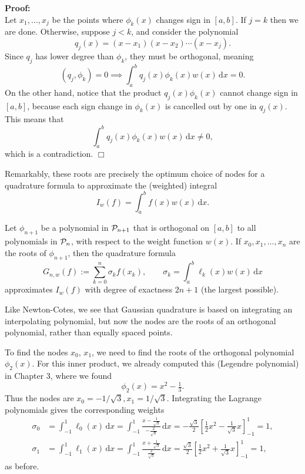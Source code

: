 \documentclass[
  letterpaper,
  DIV=11,
  numbers=noendperiod]{scrreprt}
\newenvironment{fbxSimple}[3]{\begin{tcolorbox}[enhanced, breakable,%
attach boxed title to top*={xshift=1.4pt},
boxed title style={boxrule=0.0mm, fuzzy shadow={1pt}{-1pt}{0mm}{0.1mm}{gray}, arc=.3em, rounded corners=east, sharp corners=west}, colframe=#1-color2, colbacktitle=#1-color1, colback = white, coltitle=black,  titlerule=0mm, toprule=0pt, bottomrule=.7pt, leftrule=.3em, rightrule=.7pt, outer arc=.3em,  	left=.5em, right=.5em, bottomtitle=1mm, toptitle=1mm,title=\textbf{#2}\hspace{0.5em}{#3}]}
{\end{tcolorbox}}
\begin{document}
\textbf{Proof:}\\
Let \(x_1,\ldots,x_j\) be the points where \(\phi_k(x)\) changes sign in
\([a,b]\). If \(j=k\) then we are done. Otherwise, suppose \(j<k\), and
consider the polynomial \[
q_j(x) = (x-x_1)(x-x_2)\cdots(x-x_j).
\] Since \(q_j\) has lower degree than \(\phi_k\), they must be
orthogonal, meaning \[
(q_j,\phi_k)=0 \implies \int_a^b q_j(x)\phi_k(x)w(x)\,\mathrm{d}x = 0.
\] On the other hand, notice that the product \(q_j(x)\phi_k(x)\) cannot
change sign in \([a,b]\), because each sign change in \(\phi_k(x)\) is
cancelled out by one in \(q_j(x)\). This means that \[
\int_a^b q_j(x)\phi_k(x)w(x)\,\mathrm{d}x \neq 0,
\] which is a contradiction. \(\Box\)

Remarkably, these roots are precisely the optimum choice of nodes for a
quadrature formula to approximate the (weighted) integral \[
I_{w}(f) = \int_a^b f(x)w(x)\,\mathrm{d}x.
\]

\label{gaussian-quadrature-1}
\begin{fbxSimple}{theorem}{Theorem 4.3: }{Gaussian quadrature}
\label{gaussian-quadrature-1}
Let \(\phi_{n+1}\) be a polynomial in \({\cal P}_{n+1}\) that is
orthogonal on \([a,b]\) to all polynomials in \({\cal P}_{n}\), with
respect to the weight function \(w(x)\). If \(x_0,x_1,\ldots,x_n\) are
the roots of \(\phi_{n+1}\), then the quadrature formula \[
G_{n,w}(f) := \sum_{k=0}^n\sigma_kf(x_k), \qquad \sigma_k = \int_a^b\ell_k(x)w(x)\,\mathrm{d}x
\] approximates \(I_w(f)\) with degree of exactness \({2n+1}\) (the
largest possible).

\end{fbxSimple}

Like Newton-Cotes, we see that Gaussian quadrature is based on
integrating an interpolating polynomial, but now the nodes are the roots
of an orthogonal polynomial, rather than equally spaced points.

\label{gaussian-quadrature-with-n1-on--11-and-wx1-again}
\begin{fbxSimple}{eg}{Example 4.14: }{Gaussian quadrature with \(n=1\) on \([-1,1]\) and \(w(x)=1\) (again)}
\label{gaussian-quadrature-with-n1-on--11-and-wx1-again}
To find the nodes \(x_0\), \(x_1\), we need to find the roots of the
orthogonal polynomial \(\phi_2(x)\). For this inner product, we already
computed this (Legendre polynomial) in Chapter 3, where we found \[
\phi_2(x) = x^2 - \tfrac13.
\] Thus the nodes are \(x_0= -1/\sqrt{3}, x_1=1/\sqrt{3}\). Integrating
the Lagrange polynomials gives the corresponding weights \[
\begin{aligned}
\sigma_0 &= \int_{-1}^1\ell_0(x)\,\mathrm{d}x = \int_{-1}^1\frac{x-\tfrac1{\sqrt{3}}}{-\tfrac2{\sqrt{3}}}\,\mathrm{d}x = -\tfrac{\sqrt{3}}{2}\left[\tfrac12x^2 - \tfrac1{\sqrt{3}}x\right]_{-1}^1 = 1,\\
\sigma_1 &= \int_{-1}^1\ell_1(x)\,\mathrm{d}x = \int_{-1}^1\frac{x+\tfrac1{\sqrt{3}}}{\tfrac2{\sqrt{3}}}\,\mathrm{d}x = \tfrac{\sqrt{3}}{2}\left[\tfrac12x^2 + \tfrac1{\sqrt{3}}x\right]_{-1}^1 = 1,
\end{aligned}
\] as before.

\end{fbxSimple}
\end{document}
